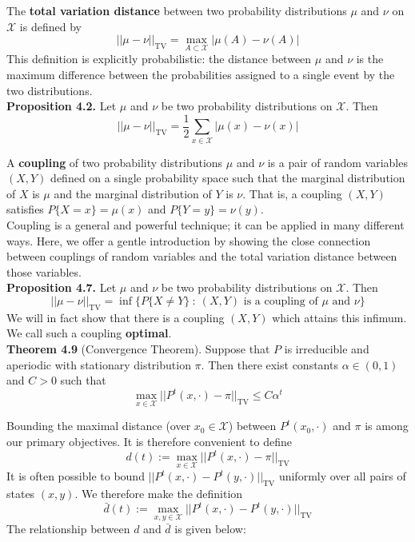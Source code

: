 \documentclass[12pt]{article}
\DeclareMathOperator*{\TV}{\text{TV}}
\begin{document}
The \textbf{total variation distance} between two probability distributions $\mu$ and $\nu$ on $\mathcal{X}$ is defined by $$||\mu - \nu||_{\TV} = \max_{A \subset \mathcal{X}} | \mu(A) - \nu(A)|$$ This definition is explicitly probabilistic: the distance between $\mu$ and $\nu$ is the maximum difference between the probabilities assigned to a single event by the two distributions.\\

\textbf{Proposition 4.2.} Let $\mu$ and $\nu$ be two probability distributions on $\mathcal{X}$. Then $$||\mu - \nu||_{\TV} = \frac{1}{2} \sum_{x \in \mathcal{X}} | \mu(x) - \nu(x) |$$

A \textbf{coupling} of two probability distributions $\mu$ and $\nu$ is a pair of random variables $(X, Y)$ defined on a single probability space such that the marginal distribution of $X$ is $\mu$ and the marginal distribution of $Y$ is $\nu$. That is, a coupling $(X, Y)$ satisfies $P\{X = x\} = \mu(x)$ and $P\{Y = y\} = \nu(y)$.\\

Coupling is a general and powerful technique; it can be applied in many different ways. Here, we offer a gentle introduction by showing the close connection between couplings of random variables and the total variation distance between those variables.\\

\textbf{Proposition 4.7.} Let $\mu$ and $\nu$ be two probability distributions on $\mathcal{X}$. Then $$||\mu - \nu||_{\TV} = \inf\{P\{X \neq Y\} \ : \ (X, Y) \text{ is a coupling of } \mu \text{ and } \nu\}$$ We will in fact show that there is a coupling $(X, Y)$ which attains this infimum. We call such a coupling \textbf{optimal}.\\

\textbf{Theorem 4.9} (Convergence Theorem). Suppose that $P$ is irreducible and aperiodic with stationary distribution $\pi$. Then there exist constants $\alpha \in (0, 1)$ and $C > 0$ such that $$\max_{x \in \mathcal{X}} ||P^t(x, \cdot) - \pi||_{\TV} \leq C \alpha^t$$

Bounding the maximal distance (over $x_0 \in \mathcal{X}$) between $P^t(x_0, \cdot)$ and $\pi$ is among our primary objectives. It is therefore convenient to define $$d(t) := \max_{x \in \mathcal{X}} || P^t(x, \cdot) - \pi||_{\TV}$$ It is often possible to bound $||P^t(x, \cdot) - P^t(y, \cdot)||_{\TV}$ uniformly over all pairs of states $(x,y)$. We therefore make the definition $$\bar{d}(t) := \max_{x,y \in \mathcal{X}} ||P^t(x, \cdot) - P^t(y, \cdot)||_{\TV}$$ The relationship between $d$ and $\bar{d}$ is given below:\\
\end{document}
